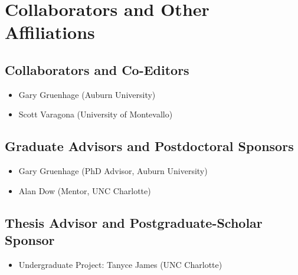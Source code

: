 
\section{Collaborators and Other Affiliations}

\subsection{Collaborators and Co-Editors}
\begin{itemize}
  \item Gary Gruenhage (Auburn University)
  \item Scott Varagona (University of Montevallo)
\end{itemize}
\subsection{Graduate Advisors and Postdoctoral Sponsors}
\begin{itemize}
  \item Gary Gruenhage (PhD Advisor, Auburn University)
  \item Alan Dow (Mentor, UNC Charlotte)
\end{itemize}
\subsection{Thesis Advisor and Postgraduate-Scholar Sponsor}
\begin{itemize}
  \item Undergraduate Project: Tanyce James (UNC Charlotte)
\end{itemize}
